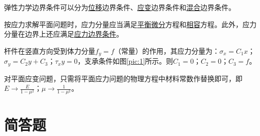 \documentclass[12pt,fontset=windows]{ctexart}
\newcommand{\answerWord}[1]{{\kaishu\underline{\;#1\;}}}
\begin{document}
\begin{enumerate}
	\item 弹性力学边界条件可以分为\answerWord{位移}边界条件、\answerWord{应变}边界条件和\answerWord{混合}边界条件。
	
	\begin{minipage}{0.7\linewidth}
		\item 按应力求解平面问题时，应力分量应当满足\answerWord{平衡微分}方程和\answerWord{相容}方程。此外，应力分量在边界上还应满足\answerWord{应力边界条件}。
		\item 杆件在竖直方向受到体力分量$f_y=f（常量）$的作用，其应力分量为：$\sigma_x=C_1 x$；$\sigma_y=C_2 y+C_3$；$\tau_xy=0$，支承条件如图\ref{pic:1}所示。则$C_1=$\answerWord{$0$}；$C_2=$\answerWord{$0$}；$C_3=$\answerWord{$f$}。
		\item 对平面应变问题，只需将平面应力问题的物理方程中材料常数作替换即可，即$E\rightarrow$\answerWord{$\frac{E}{1-\mu^2}$}；$\mu\rightarrow$\answerWord{$\frac{1}{1-\mu^2}$}。
	\end{minipage}
	\hfill
	\begin{minipage}{0.3\linewidth}
		\centering
		\label{pic:1}
	\end{minipage}
\end{enumerate}


\section{简答题}
\end{document}
